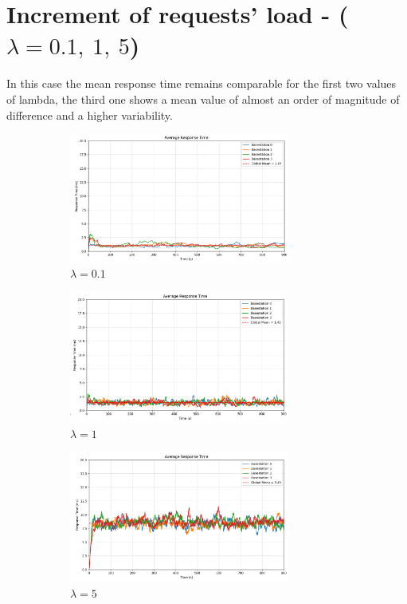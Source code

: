 \documentclass{report}
\begin{document}
\section{Increment of requests' load - ($\lambda=0.1,\ 1,\ 5$)}
In this case the mean response time remains comparable for the first two values of lambda, the third one shows a mean value of almost an order of magnitude of difference and a higher variability.

\begin{figure}[H]
    \begin{subfigure}{0.55\textwidth}
        \centering
        \includegraphics[width=0.8\textwidth]{img/rt_lambda_01.png}
        \caption{$\lambda = 0.1$}
    \end{subfigure}
    \begin{subfigure}{0.55\textwidth}
        \centering
        \includegraphics[width=0.8\textwidth]{img/rt_lambda_1.png}
        \caption{$\lambda = 1$}
        \label{rt_50}
    \end{subfigure}
    \begin{subfigure}{0.55\textwidth}
        \centering
        \includegraphics[width=0.8\textwidth]{img/rt_lambda_5.png}
        \caption{$\lambda = 5$}
    \end{subfigure}
    \caption{}
\end{figure}
\end{document}
